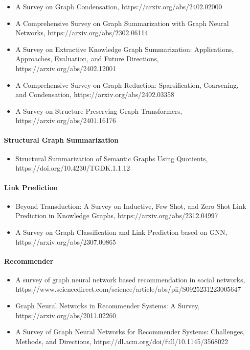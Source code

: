 \begin{itemize}
\item A Survey on Graph Condensation, https://arxiv.org/abs/2402.02000

\item A Comprehensive Survey on Graph Summarization with Graph Neural Networks, https://arxiv.org/abs/2302.06114

\item A Survey on Extractive Knowledge Graph Summarization: Applications, Approaches, Evaluation, and Future Directions, https://arxiv.org/abs/2402.12001

\item A Comprehensive Survey on Graph Reduction: Sparsification, Coarsening, and Condensation, https://arxiv.org/abs/2402.03358

\item A Survey on Structure-Preserving Graph Transformers, https://arxiv.org/abs/2401.16176
\end{itemize}


\paragraph{Structural Graph Summarization}

\begin{itemize}
\item Structural Summarization of Semantic Graphs Using Quotients, https://doi.org/10.4230/TGDK.1.1.12
\end{itemize}
 
\paragraph{Link Prediction}

\begin{itemize}
\item Beyond Transduction: A Survey on Inductive, Few Shot, and Zero Shot Link Prediction in Knowledge Graphs, https://arxiv.org/abs/2312.04997

\item A Survey on Graph Classification and Link Prediction based on GNN, https://arxiv.org/abs/2307.00865
\end{itemize}

\paragraph{Recommender}

\begin{itemize}
\item A survey of graph neural network based recommendation in social networks, https://www.sciencedirect.com/science/article/abs/pii/S0925231223005647

\item Graph Neural Networks in Recommender Systems: A Survey, https://arxiv.org/abs/2011.02260

\item A Survey of Graph Neural Networks for Recommender Systems: Challenges, Methods, and Directions, https://dl.acm.org/doi/full/10.1145/3568022
\end{itemize}

